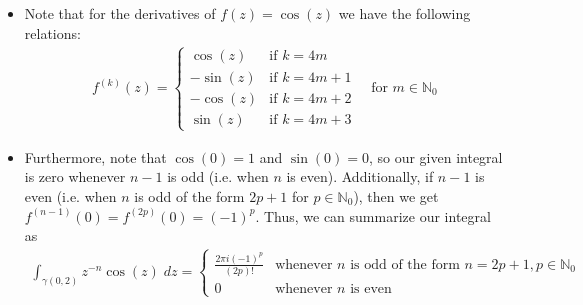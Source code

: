 \documentclass[10pt,a4paper]{article}
\theoremstyle{definition}
\begin{document}
\begin{enumerate}[label = (\alph*)]
\begin{itemize}
	\item Note that for the derivatives of $f(z) = \cos(z)$ we have the following relations:
	\begin{align*}
	f^{(k)}(z) = \begin{cases}
	\cos(z) &\text{if $k = 4m$}\\
	-\sin(z) &\text{if $k = 4m + 1$}\\
	-\cos(z) &\text{if $k = 4m + 2$}\\
	\sin(z) &\text{if $k = 4m + 3$}
	\end{cases} \quad \text{for $m \in \mathbb{N}_0$}
	\end{align*}
	\item Furthermore, note that $\cos(0) = 1$ and $\sin(0) = 0$, so our given integral is zero whenever $n - 1$ is odd (i.e. when $n$ is even). Additionally, if $n - 1$ is even (i.e. when $n$ is odd of the form $2p + 1$ for $p \in \mathbb{N}_0$), then we get $f^{(n - 1)}(0) = f^{(2p)}(0) = (-1)^p$. Thus, we can summarize our integral as 
	\begin{align*}
	\boxed{\int_{\gamma(0,2)} z^{-n}\cos(z) \; dz = \begin{cases}
	\displaystyle \frac{2\pi i (-1)^p}{(2p)!} &\text{whenever $n$ is odd of the form $n = 2p + 1, p \in \mathbb{N}_0$}\\
	0 &\text{whenever $n$ is even}
	\end{cases}}
	\end{align*}
	\end{itemize}
\end{enumerate}
\end{document}
